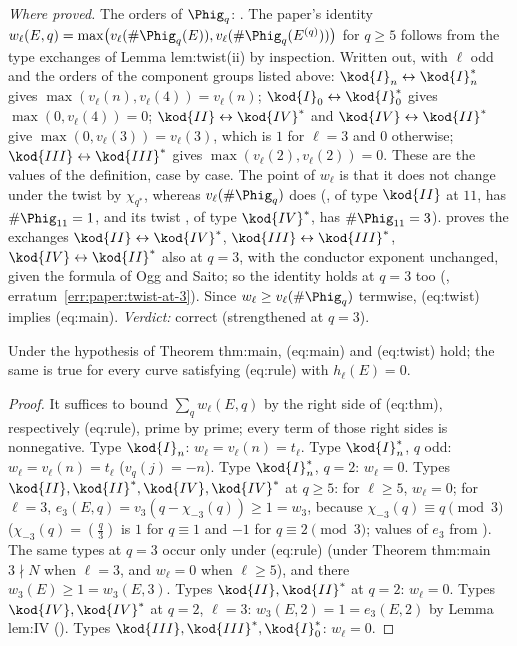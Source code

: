\begin{sloppypar}
\noindent\emph{Where proved.} The orders of $\Phig_q$: . The paper's identity $w_\ell(E,q)=\max\bigl(v_\ell(\#\Phig_q(E)),v_\ell(\#\Phig_q(E^{(q)}))\bigr)$ for $q\ge5$
follows from the type exchanges of Lemma lem:twist(ii) by inspection. Written out, with $\ell$ odd and the orders of the component groups listed above: $\kod{I}_n\leftrightarrow\kod{I}_n^*$ gives
$\max(v_\ell(n),v_\ell(4))=v_\ell(n)$; $\kod{I}_0\leftrightarrow\kod{I}_0^*$ gives $\max(0,v_\ell(4))=0$; $\kod{II}\leftrightarrow\kod{IV}^*$ and $\kod{IV}\leftrightarrow\kod{II}^*$ give $\max(0,v_\ell(3))=v_\ell(3)$, which is $1$ for $\ell=3$ and $0$
otherwise; $\kod{III}\leftrightarrow\kod{III}^*$ gives $\max(v_\ell(2),v_\ell(2))=0$. These are the values of the definition, case by case. The point of $w_\ell$ is that it does not change under the
twist by $\chi_{q^*}$, whereas $v_\ell(\#\Phig_q)$ does (, of type $\kod{II}$ at $11$, has $\#\Phig_{11}=1$, and its twist , of type $\kod{IV}^*$, has $\#\Phig_{11}=3$).  proves the
exchanges $\kod{II}\leftrightarrow\kod{IV}^*$, $\kod{III}\leftrightarrow\kod{III}^*$, $\kod{IV}\leftrightarrow\kod{II}^*$ also at $q=3$, with the conductor exponent unchanged, given the formula of Ogg and
Saito; so the identity holds at $q=3$ too (, erratum~\ref{err:paper:twist-at-3}). Since $w_\ell\ge v_\ell(\#\Phig_q)$ termwise, (eq:twist) implies (eq:main).
\emph{Verdict:} correct (strengthened at $q=3$).

\begin{proposition}\label{prop:paper:forms}
Under the hypothesis of Theorem thm:main, (eq:main) and (eq:twist) hold; the same is true for every curve satisfying (eq:rule) with $h_\ell(E)=0$.
\end{proposition}

\begin{proof}
It suffices to bound $\sum_qw_\ell(E,q)$ by the right side of (eq:thm), respectively (eq:rule), prime by prime; every term of those right sides is
nonnegative. Type $\kod{I}_n$: $w_\ell=v_\ell(n)=t_\ell$. Type $\kod{I}_n^*$, $q$ odd: $w_\ell=v_\ell(n)=t_\ell$ ($v_q(j)=-n$). Type $\kod{I}_n^*$, $q=2$: $w_\ell=0$. Types $\kod{II},\kod{II}^*,\kod{IV},\kod{IV}^*$ at
$q\ge5$: for $\ell\ge5$, $w_\ell=0$; for $\ell=3$, $e_3(E,q)=v_3(q-\chi_{-3}(q))\ge1=w_3$, because $\chi_{-3}(q)\equiv q\pmod3$ ($\chi_{-3}(q)=(\frac q3)$ is $1$ for $q\equiv1$ and $-1$ for
$q\equiv2\pmod3$; values of $e_3$ from ). The same types at $q=3$ occur only
under (eq:rule) (under Theorem thm:main $3\nmid N$ when $\ell=3$, and $w_\ell=0$ when $\ell\ge5$), and there $w_3(E)\ge1=w_3(E,3)$. Types $\kod{II},\kod{II}^*$ at $q=2$: $w_\ell=0$. Types
$\kod{IV},\kod{IV}^*$ at $q=2$, $\ell=3$: $w_3(E,2)=1=e_3(E,2)$ by Lemma lem:IV (). Types $\kod{III},\kod{III}^*,\kod{I}_0^*$: $w_\ell=0$.
\end{proof}


\end{sloppypar}

